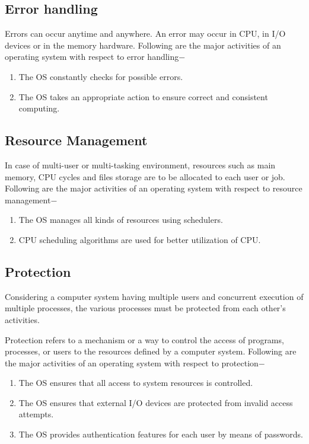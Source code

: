 \documentclass[a4paper,10pt]{article}
\begin{document}
  \subsection{Error handling}
  Errors can occur anytime and anywhere. An error may occur in CPU, in I/O devices or in the memory hardware. Following are the major activities of an operating system with respect to error handling$-$
  \begin{enumerate}
   \item The OS constantly checks for possible errors.
   \item The OS takes an appropriate action to ensure correct and consistent computing.
  \end{enumerate}
  \subsection{Resource Management}
  In case of multi-user or multi-tasking environment, resources such as main memory, CPU cycles and files storage are to be allocated to each user or job. Following are the major activities of an operating system with respect to resource management$-$
  \begin{enumerate}
   \item The OS manages all kinds of resources using schedulers.
   \item CPU scheduling algorithms are used for better utilization of CPU.
  \end{enumerate}
  \subsection{Protection}
  Considering a computer system having multiple users and concurrent execution of multiple processes, the various processes must be protected from each other's activities.

Protection refers to a mechanism or a way to control the access of programs, processes, or users to the resources defined by a computer system. Following are the major activities of an operating system with respect to protection$-$
 \begin{enumerate}
  \item The OS ensures that all access to system resources is controlled.
  \item The OS ensures that external I/O devices are protected from invalid access attempts.
  \item The OS provides authentication features for each user by means of passwords.
 \end{enumerate}
 \newpage
 
\end{document}
